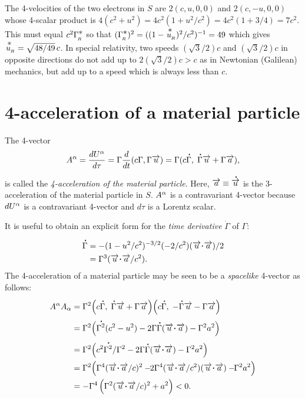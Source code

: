 \soln The 4-velocities of the two electrons in $S$ are\break 
$2(c,u,0,0) $ and $2(c,-u,0, 0) $ whose 4-scalar 
product 
is  $4(c^2+u^2)= 4c^2 (1+u^2/c^2)=4c^2(1+3/4)=7c^2$. 
This must equal $ c^2 \Gamma^{\textstyle \ast}_{_{\hspace*{-1.5pt}{R}}}$ so that 
$(\Gamma^{\textstyle \ast}_{_{\hspace*{-1.5pt}{R}}})^2 = 
((1-\overset{{\,\,{\textstyle \ast}}}{u}_{_{\hspace*{-1.5pt}{R}}})^2/c^2)^{-1}  = 49$ which gives 
$\overset{{\,\,{\textstyle \ast}}}{u}_{_{\hspace*{-1.5pt}{R}}} =\sqrt{48/49}\,c$. In special 
relativity, 
two speeds $(\sqrt{3}/2)c$ and $(\sqrt{3}/2)c$ in 
opposite 
directions {do not add up to} $2(\sqrt{3}/2)c >c$ as 
in 
Newtonian (Galilean) mechanics, but add up to a speed 
which 
is always less than $c$.  \ebx

\section{4-acceleration of a material particle}
The 4-vector
\begin{align}\label{pmadd20}
A^{{\alpha}}=\frac{dU^{{\alpha}}}{d\tau}=\Gamma \frac{d}{dt}(
c\Gamma,\Gamma \overrightarrow{u})=\Gamma (
c{\overset{\hspace*{1.5pt}\centerdot}{\Gamma} },\;{\overset{\hspace*{1.5pt}\centerdot}{\Gamma} } \overrightarrow{u}+\Gamma\overrightarrow{a}),
\end{align}
is called the \textsl{4-acceleration of the material 
particle}. Here, $\overrightarrow{a}\equiv {\ensuremath{\overset{\hspace*{1.5pt}\centerdot}{\overrightarrow{u}}} }$ is 
the 
3-acceleration of the material particle in $S$. 
$A^{{\alpha}}$ is 
a contravariant 4-vector because $dU^{{\alpha}}$ is a 
contravariant 4-vector and $d\tau$ is a Lorentz scalar.

It is useful to obtain an explicit form for the  
\textsl{time derivative} $\dot{\Gamma}$ of $\Gamma$:
\begin{align}\label{pmadd21}
\dot{\Gamma}&=-(1-u^2/c^2)^{-3/2}(-2/c^2)(\veca{u}
\dotp\veca{a })/2\notag\\& 
=\Gamma^3(\veca{u}\dotp\veca{a} /c^2).
\end{align}
The 4-acceleration of a material particle may be seen
to be a \textsl{spacelike} 4-vector as follows:
\begin{align}
A^\gka A_ \gka &=\Gamma^2 \Big( c\dot{\Gamma} ,\;
\dot{\Gamma} \veca{u} + \Gamma\veca{a}\Big)
  \Big( c\dot{\Gamma} ,\;
-\dot{\Gamma} \veca{u} - \Gamma\veca{a}\Big) \notag\\ 
&=\Gamma^2 \Big(\dot{\Gamma^2}(c^2- u^2) 
-2\Gamma\dot{\Gamma} (\veca{u}\dotp\veca{a}) - 
\Gamma^2 
a^2\Big)\notag \\
& =\Gamma^2 \Big(c^2\dot{\Gamma^2}/\Gamma^2 
-2\Gamma\dot{\Gamma} (\veca{u}\dotp\veca{a})
- \Gamma^2 a^2\Big) \notag \\ 
& =\Gamma^2 \Big(\Gamma^4(\veca{u}\dotp\veca{a}/c)^2 
-\nnt2\Gamma^4(\veca{u} \dotp \veca{a}/c^2) 
(\veca{u}\dotp\veca{a}) -\nnt 
\Gamma^2 a^2\Big) \notag \\ 
&=-\Gamma^4 \left(\Gamma^2(\veca{u}\dotp\veca{a}/c)^2
+ a^2\right)<0.\label{pmadd24}
\end{align}

